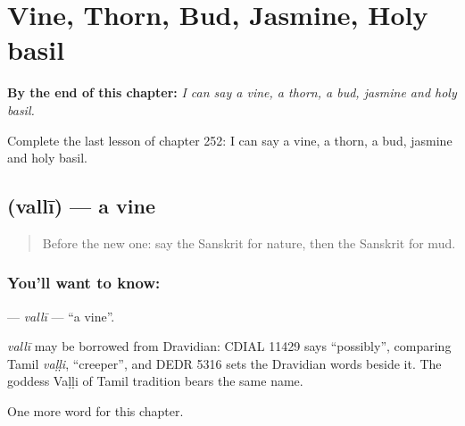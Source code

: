 
\chapter{Vine, Thorn, Bud, Jasmine, Holy basil}
\label{ch:sa-vine-thorn-bud-jasmine-holy-basil}

\begin{chapteropening}
\textbf{By the end of this chapter:} \emph{I can say a vine, a thorn, a bud, jasmine and holy basil.}

Complete the last lesson of chapter 252: I can say a vine, a thorn, a bud, jasmine and holy basil.
\end{chapteropening}

\section[\texorpdfstring{\sk{वल्ली} (vallī)}{वल्ली (vallī)}]{ (vallī) — a vine}

\label{lesson:SA-C252-valli}



\begin{quote}
Before the new one: say the Sanskrit for nature, then the Sanskrit for mud.
\end{quote}

\subsection*{You'll want to know: }
\textbf{} — \emph{vallī} — \textquotedblleft{}a vine\textquotedblright{}.

\begin{cousinweb}
\emph{vallī} may be borrowed from Dravidian: CDIAL 11429 says \textquotedblleft{}possibly\textquotedblright{}, comparing Tamil \emph{vaḷḷi}, \textquotedblleft{}creeper\textquotedblright{}, and DEDR 5316 sets the Dravidian words beside it. The goddess Vaḷḷi of Tamil tradition bears the same name.
\end{cousinweb}

\begin{grammarlens}[title={What you've built}]
One more word for this chapter.
\end{grammarlens}

